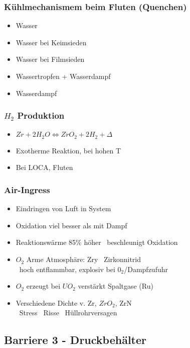 \documentclass[12pt]{article}
\begin{document}
\subsubsection{Kühlmechanismem beim Fluten (Quenchen)}
\begin{itemize}[noitemsep]
	\item Wasser
	\item Wasser bei Keimsieden
	\item Wasser bei Filmsieden
	\item Wassertropfen + Wasserdampf
	\item Wasserdampf
\end{itemize}

\subsubsection{\(H_2\) Produktion}
\begin{itemize}[noitemsep]
	\item \(Zr + 2 H_2O \Leftrightarrow ZrO_2 + 2 H_2 + \Delta\)
	\item Exotherme Reaktion, bei hohen T
	\item Bei LOCA, Fluten
\end{itemize}

\subsubsection{Air-Ingress}
\begin{itemize}[noitemsep]
	\item Eindringen von Luft in System
	\item Oxidation viel besser als mit Dampf
	\item Reaktionswärme 85\% höher \textrightarrow\ beschleunigt Oxidation
	\item \(O_2\) Arme Atmosphäre: Zry \textrightarrow\ Zirkonnitrid\\
		\textrightarrow\ hoch entflammbar, explosiv bei \(0_2\)/Dampfzufuhr
	\item \(O_2\) erzeugt bei \(UO_2\) verstärkt Spaltgase (Ru)
	\item Verschiedene Dichte v. Zr, \(ZrO_2\), ZrN\\
		\textrightarrow\ Stress \textrightarrow\ Risse \textrightarrow\ Hüllrohrversagen
\end{itemize}

\subsection{Barriere 3 - Druckbehälter}
\end{document}
